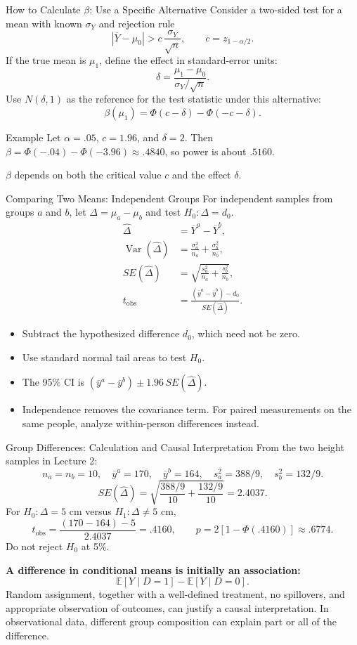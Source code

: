 \documentclass[10pt,aspectratio=169]{beamer}
\newcommand{\E}{\mathbb{E}}
\newcommand{\Var}{\operatorname{Var}}
\begin{document}
\begin{frame}{How to Calculate $\beta$: Use a Specific Alternative}
\small
Consider a two-sided test for a mean with known $\sigma_Y$ and rejection rule
\[
|\overline Y-\mu_0|>c\,\frac{\sigma_Y}{\sqrt n},
\qquad c=z_{1-\alpha/2}.
\]
If the true mean is $\mu_1$, define the effect in standard-error units:
\[
\delta=\frac{\mu_1-\mu_0}{\sigma_Y/\sqrt n}.
\]
Use $N(\delta,1)$ as the reference for the test statistic under this alternative:
\[
\boxed{\beta(\mu_1)=\Phi(c-\delta)-\Phi(-c-\delta)}.
\]
\begin{block}{Example}
Let $\alpha=.05$, $c=1.96$, and $\delta=2$.
Then $\beta=\Phi(-.04)-\Phi(-3.96)\approx .4840$, so power is about $.5160$.
\end{block}
$\beta$ depends on both the critical value $c$ and the effect $\delta$.
\end{frame}

\begin{frame}{Comparing Two Means: Independent Groups}
\small
For independent samples from groups $a$ and $b$, let $\Delta=\mu_a-\mu_b$ and test $H_0:\Delta=d_0$.
\begin{align*}
\widehat\Delta&=\overline Y^a-\overline Y^b,\\
\Var(\widehat\Delta)&=\frac{\sigma_a^2}{n_a}+\frac{\sigma_b^2}{n_b},\\
SE(\widehat\Delta)&=\sqrt{\frac{s_a^2}{n_a}+\frac{s_b^2}{n_b}},\\
t_{\mathrm{obs}}&=\frac{(\overline y^a-\overline y^b)-d_0}{SE(\widehat\Delta)}.
\end{align*}
\begin{itemize}
\item Subtract the hypothesized difference $d_0$, which need not be zero.
\item Use standard normal tail areas to test $H_0$.
\item The 95\% CI is $(\overline y^a-\overline y^b)\pm1.96\,SE(\widehat\Delta)$.
\item Independence removes the covariance term. For paired measurements on the same people, analyze within-person differences instead.
\end{itemize}
\end{frame}

\begin{frame}{Group Differences: Calculation and Causal Interpretation}
\small
From the two height samples in Lecture 2:
\[
n_a=n_b=10,\quad \overline y^a=170,\quad\overline y^b=164,
\quad s_a^2=388/9,\quad s_b^2=132/9.
\]
\[
SE(\widehat\Delta)=\sqrt{\frac{388/9}{10}+\frac{132/9}{10}}=2.4037.
\]
For $H_0:\Delta=5$ cm versus $H_1:\Delta\ne5$ cm,
\[
t_{\mathrm{obs}}=\frac{(170-164)-5}{2.4037}=.4160,
\qquad p=2[1-\Phi(.4160)]\approx .6774.
\]
Do not reject $H_0$ at 5\%.
\par\medskip
\textbf{A difference in conditional means is initially an association:}
\[
\E[Y\mid D=1]-\E[Y\mid D=0].
\]
Random assignment, together with a well-defined treatment, no spillovers, and appropriate observation of outcomes, can justify a causal interpretation.
In observational data, different group composition can explain part or all of the difference.
\end{frame}
\end{document}
